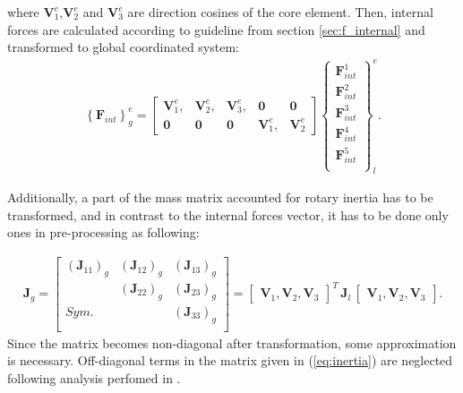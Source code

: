 \documentclass[sensors,article,submit,moreauthors,pdftex]{Definitions/mdpi}
\begin{document}
where \(\textbf{V}^e_1\),\(\textbf{V}^e_2\) and \(\textbf{V}^e_3\) are direction cosines of the core element. Then, internal forces are calculated according to guideline from section \ref{sec:f_internal} and transformed to global coordinated system:
\begin{eqnarray}
	\left\{\textbf{F}_{int}\right\}^e_g =
	\left [\begin{array}{ccccc}
		\textbf{V}^e_1, & \textbf{V}^e_2, & \textbf{V}^e_3, & \textbf{0} & \textbf{0} \\
		\textbf{0} & \textbf{0} & \textbf{0} & \textbf{V}^e_1, & \textbf{V}^e_2
	\end{array}\right ]
	\left \{\begin{array}{c}
		\textbf{F}^1_{int} \\
		\textbf{F}^2_{int} \\
		\textbf{F}^3_{int} \\
		\textbf{F}^4_{int} \\
		\textbf{F}^5_{int} \\
	\end{array}\right \}_l^e.
	\label{eq:f_global}
\end{eqnarray}

Additionally, a part of the mass matrix accounted for rotary inertia has to be transformed, and in contrast to the internal forces vector, it has to be done only ones in pre-processing as following:

\begin{eqnarray}
\textbf{J}_g=\left [ 
\begin{array}{ccc}
	\left (\textbf{J}_{11}\right )_g & \left (\textbf{J}_{12}\right )_g & \left (\textbf{J}_{13}\right )_g\\
	 & \left (\textbf{J}_{22}\right )_g & \left (\textbf{J}_{23}\right )_g\\
	Sym. &  & \left (\textbf{J}_{33}\right )_g\\
\end{array}
\right ]
=\left[\begin{array}{ccc}
	\textbf{V}_1, \textbf{V}_2, \textbf{V}_3 \end{array}\right ]^T
\,\textbf{J}_l\,
\left[\begin{array}{ccc}
	\textbf{V}_1, \textbf{V}_2, \textbf{V}_3 \end{array}\right ].
\label{eq:inertia}
\end{eqnarray}
Since the matrix becomes non-diagonal after transformation, some approximation is necessary.
Off-diagonal terms in the matrix given in (\ref{eq:inertia}) are neglected following analysis perfomed in \cite{surana1980transition}.
\end{document}
